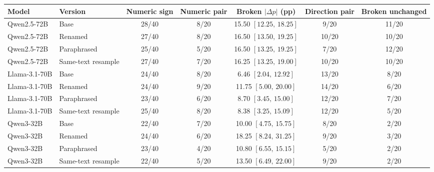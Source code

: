 \begin{tabular}{@{}llccccc@{}}
\toprule
Model & Version & Numeric sign & Numeric pair & Broken $|\Delta p|$ (pp) & Direction pair & Broken unchanged \\
\midrule
Qwen2.5-72B & Base & 28/40 & 8/20 & 15.50 $[12.25,\,18.25]$ & 9/20 & 11/20 \\
Qwen2.5-72B & Renamed & 27/40 & 8/20 & 16.50 $[13.50,\,19.25]$ & 10/20 & 10/20 \\
Qwen2.5-72B & Paraphrased & 25/40 & 5/20 & 16.50 $[13.25,\,19.25]$ & 7/20 & 12/20 \\
Qwen2.5-72B & Same-text resample & 27/40 & 7/20 & 16.25 $[13.25,\,19.00]$ & 10/20 & 10/20 \\
Llama-3.1-70B & Base & 24/40 & 8/20 & 6.46 $[2.04,\,12.92]$ & 13/20 & 8/20 \\
Llama-3.1-70B & Renamed & 24/40 & 9/20 & 11.75 $[5.00,\,20.00]$ & 14/20 & 6/20 \\
Llama-3.1-70B & Paraphrased & 23/40 & 6/20 & 8.70 $[3.45,\,15.00]$ & 12/20 & 7/20 \\
Llama-3.1-70B & Same-text resample & 25/40 & 8/20 & 8.38 $[3.25,\,15.09]$ & 12/20 & 5/20 \\
Qwen3-32B & Base & 22/40 & 7/20 & 10.00 $[4.75,\,15.75]$ & 8/20 & 2/20 \\
Qwen3-32B & Renamed & 24/40 & 6/20 & 18.25 $[8.24,\,31.25]$ & 9/20 & 3/20 \\
Qwen3-32B & Paraphrased & 23/40 & 4/20 & 10.80 $[6.55,\,15.15]$ & 5/20 & 2/20 \\
Qwen3-32B & Same-text resample & 22/40 & 5/20 & 13.50 $[6.49,\,22.00]$ & 9/20 & 2/20 \\
\bottomrule
\end{tabular}
